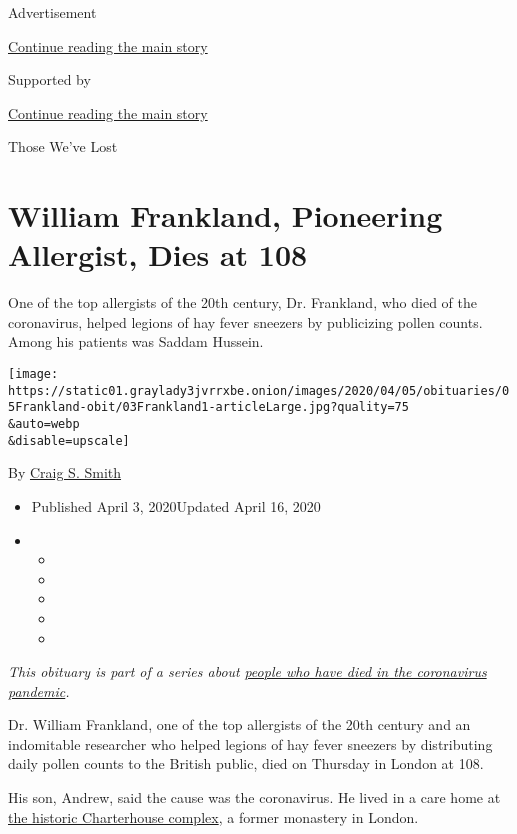 Advertisement

\protect\hyperlink{after-top}{Continue reading the main story}

Supported by

\protect\hyperlink{after-sponsor}{Continue reading the main story}

Those We've Lost

\hypertarget{william-frankland-pioneering-allergist-dies-at-108}{%
\section{William Frankland, Pioneering Allergist, Dies at
108}\label{william-frankland-pioneering-allergist-dies-at-108}}

One of the top allergists of the 20th century, Dr. Frankland, who died
of the coronavirus, helped legions of hay fever sneezers by publicizing
pollen counts. Among his patients was Saddam Hussein.

\texttt{[image: https://static01.graylady3jvrrxbe.onion/images/2020/04/05/obituaries/05Frankland-obit/03Frankland1-articleLarge.jpg?quality=75\\\&auto=webp\\\&disable=upscale]}

By \href{https://www.nytimes3xbfgragh.onion/by/craig-s-smith}{Craig S.
Smith}

\begin{itemize}
\item
  Published April 3, 2020Updated April 16, 2020
\item
  \begin{itemize}
  \item
  \item
  \item
  \item
  \item
  \end{itemize}
\end{itemize}

\emph{This obituary is part of a series about}
\href{https://www.nytimes3xbfgragh.onion/series/people-who-have-died-of-the-coronavirus}{\emph{people
who have died in the coronavirus pandemic}}\emph{.}

Dr. William Frankland, one of the top allergists of the 20th century and
an indomitable researcher who helped legions of hay fever sneezers by
distributing daily pollen counts to the British public, died on Thursday
in London at 108.

His son, Andrew, said the cause was the coronavirus. He lived in a care
home at \href{http://www.thecharterhouse.org/news/}{the historic
Charterhouse complex}, a former monastery in London.


